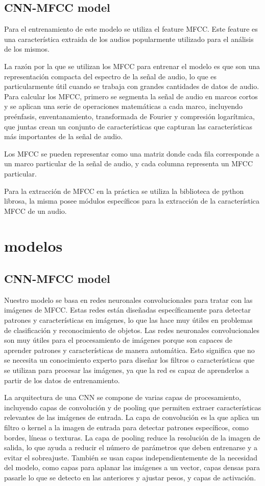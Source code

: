 \documentclass[colorinlistoftodos,twoside,twocolumn,10pt]{article} %
\begin{document}
\subsection {CNN-MFCC model}
Para el entrenamiento de este modelo se utiliza el feature MFCC. Este feature es una caracter\'istica extraida de los audios popularmente utilizado para el an\'alisis de los mismos.

La razón por la que se utilizan los MFCC para entrenar el modelo es que son una representación compacta del espectro de la señal de audio, lo que es particularmente útil cuando se trabaja con grandes cantidades de datos de audio. Para calcular los MFCC, primero se segmenta la señal de audio en marcos cortos y se aplican una serie de operaciones matemáticas a cada marco, incluyendo preénfasis, enventanamiento, transformada de Fourier y compresión logarítmica, que juntas crean un conjunto de características que capturan las características más importantes de la señal de audio.

Los MFCC se pueden representar como una matriz donde cada fila corresponde a un marco particular de la señal de audio, y cada columna representa un MFCC particular.

Para la extracci\'on de MFCC en la pr\'actica se utiliza la biblioteca de python librosa, la misma posee m\'odulos espec\'ificos para la extracci\'on de la caracter\'istica MFCC de un audio.

\section{modelos}
\subsection {CNN-MFCC model}
Nuestro modelo se basa en redes neuronales convolucionales para tratar con las imágenes de MFCC. Estas redes están diseñadas específicamente para detectar patrones y características en imágenes, lo que las hace muy útiles en problemas de clasificación y reconocimiento de objetos. Las redes neuronales convolucionales son muy útiles para el procesamiento de imágenes porque son capaces de aprender patrones y características de manera automática. Esto significa que no se necesita un conocimiento experto para diseñar los filtros o características que se utilizan para procesar las imágenes, ya que la red es capaz de aprenderlos a partir de los datos de entrenamiento.

La arquitectura de una CNN se compone de varias capas de procesamiento, incluyendo capas de convolución y de pooling que permiten extraer características relevantes de las imágenes de entrada. La capa de convolución es la que aplica un filtro o kernel a la imagen de entrada para detectar patrones específicos, como bordes, líneas o texturas. La capa de pooling reduce la resolución de la imagen de salida, lo que ayuda a reducir el número de parámetros que deben entrenarse y a evitar el sobreajuste. También se usan capas independientemente de la necesidad del modelo, como capas para aplanar las imágenes a un vector, capas densas para pasarle lo que se detecto en las anteriores y ajustar pesos, y capas de activación.
\end{document}
